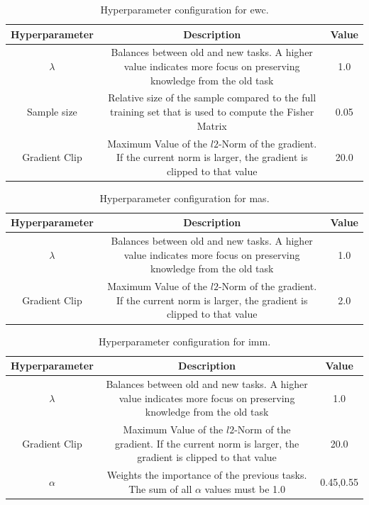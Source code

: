 \begin{table}[h!]
    \begin{tabular}{c | c c } 
        \hline
        Hyperparameter & Description & Value \\ 
        \hline 
        $\lambda$ & Balances between old and new tasks. A higher value indicates more focus
        on preserving knowledge from the old task & 1.0  \\ 
        Sample size & Relative size of the sample compared to the full training set that is used to 
        compute the Fisher Matrix & 0.05  \\ 
        Gradient Clip & Maximum Value of the $l2$-Norm of the gradient. If the current norm is larger, the
        gradient is clipped to that value & 20.0 \\ 
        \hline
    \end{tabular}
    \caption{Hyperparameter configuration for \gls{ewc}.}
    \label{fig:EWCparams}
\end{table}

\begin{table}[h!]
    \begin{tabular}{c | c c } 
        \hline
        Hyperparameter & Description & Value \\ 
        \hline 
        $\lambda$ & Balances between old and new tasks. A higher value indicates more focus
        on preserving knowledge from the old task & 1.0  \\ 
        Gradient Clip & Maximum Value of the $l2$-Norm of the gradient. If the current norm is larger, the
        gradient is clipped to that value & 2.0 \\ 
        \hline
    \end{tabular}
    \caption{Hyperparameter configuration for \gls{mas}.}
    \label{fig:MASparams}
\end{table}

\begin{table}[h!]
    \begin{tabular}{c | c c } 
        \hline
        Hyperparameter & Description & Value \\ 
        \hline 
        $\lambda$ & Balances between old and new tasks. A higher value indicates more focus
        on preserving knowledge from the old task & 1.0  \\ 
        Gradient Clip & Maximum Value of the $l2$-Norm of the gradient. If the current norm is larger, the
        gradient is clipped to that value & 20.0 \\ 
        $\alpha$ & Weights the importance of the previous tasks. The sum of all $\alpha$ values must be 1.0 & 0.45,0.55 \\
        \hline
    \end{tabular}
    \caption{Hyperparameter configuration for \gls{imm}.}
    \label{fig:IMMparams}
\end{table}


